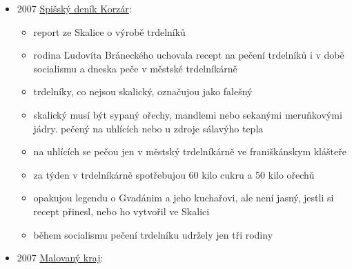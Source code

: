 \begin{itemize}
\begin{itemize}
    \begin{itemize}
    \tightlist
    \item
      co byste si vybrali z Hanáckého jídelního lístku uveřejněném v
      Selském archivu z r. 1903
    \item
      následuje seznam pokrmů, například:
    \item
      Krupičná polívka a trdelníčky. Mrkvová polívka a žitné „cajetke``.
      Zemáková polívka a čečůvka na kyselo. Česneková polívka a pečené
      kroupy.
    \item
      pak se ptají, kdopak z nás ví, jak chutnaly třeba kločinke,
      zaviják nebo trdelníčky
    \end{itemize}
  \end{itemize}
\item
  2007
  \href{https://dikda.snk.sk/uuid/uuid:36e701c1-1689-4807-876f-6895e3c17a3c}{Spišský
  deník Korzár}:

  \begin{itemize}
  \tightlist
  \item
    report ze Skalice o výrobě trdelníků
  \item
    rodina Ľudovíta Bráneckého uchovala recept na pečení trdelníků i v
    době socialismu a dneska peče v městské trdelníkárně
  \item
    trdelníky, co nejsou skalický, označujou jako falešný
  \item
    skalický musí být sypaný ořechy, mandlemi nebo sekanými meruňkovými
    jádry. pečený na uhlících nebo u zdroje sálavýho tepla
  \item
    na uhlících se pečou jen v městský trdelníkárně ve franiškánskym
    klášteře
  \item
    za týden v trdelníkárně spotřebujou 60 kilo cukru a 50 kilo ořechů
  \item
    opakujou legendu o Gvadánim a jeho kuchařovi, ale není jasný, jestli
    si recept přinesl, nebo ho vytvořil ve Skalici
  \item
    během socialismu pečení trdelníku udržely jen tři rodiny
  \end{itemize}
\item
  2007
  \href{https://ceskadigitalniknihovna.cz/uuid/uuid:889f61a0-f31b-11e3-97c9-001018b5eb5c}{Malovaný
  kraj}:


\end{itemize}
